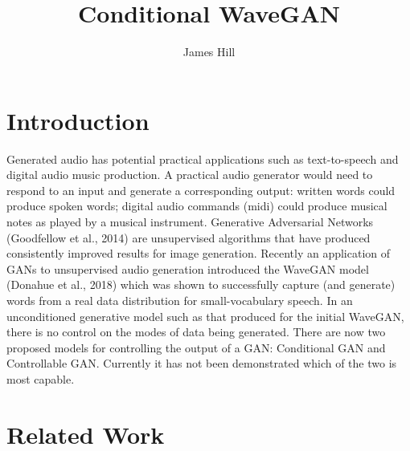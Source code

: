 \documentclass{article}
\title{Conditional WaveGAN}
\author{James Hill}
\date{}
\begin{document}
\maketitle

\section{Introduction}

Generated audio has potential practical applications such as text-to-speech and digital audio music production.
\newline
\newline
A practical audio generator would need to respond to an input and generate a corresponding output: written words could produce spoken words; digital audio commands (midi) could produce musical notes as played by a musical instrument.
\newline
\newline
Generative Adversarial Networks (Goodfellow et al., 2014) are unsupervised algorithms that have produced consistently improved results for image generation.
\newline
\newline
Recently an application of GANs to unsupervised audio generation introduced the WaveGAN model (Donahue et al., 2018) which was shown to successfully capture (and generate) words from a real data distribution for small-vocabulary speech.
\newline
\newline
In an unconditioned generative model such as that produced for the initial WaveGAN, there is no control on the modes of data being generated.
There are now two proposed models for controlling the output of a GAN: Conditional GAN and Controllable GAN.
Currently it has not been demonstrated which of the two is most capable.

\section{Related Work}
\end{document}
